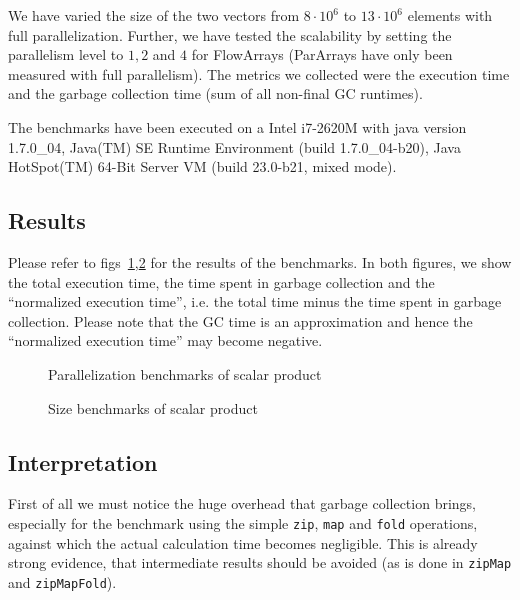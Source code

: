 \documentclass[runningheads,a4paper,fleqn]{llncs}
\begin{document}
We have varied the size of the two vectors from $8 \cdot 10^6$ to $13
\cdot 10^6$ elements with full parallelization. Further, we have
tested the scalability by setting the parallelism level to $1,2$ and
$4$ for FlowArrays (ParArrays have only been measured with full
parallelism). The metrics we collected were the execution time and the
garbage collection time (sum of all non-final GC runtimes).

The benchmarks have been executed on a Intel i7-2620M with java
version 1.7.0\_04, Java(TM) SE Runtime Environment (build
1.7.0\_04-b20), Java HotSpot(TM) 64-Bit Server VM (build 23.0-b21,
mixed mode).

\subsection{Results}

Please refer to figs~\ref{fig:par-bench},\ref{fig:size-bench} for the
results of the benchmarks. In both figures, we show the total
execution time, the time spent in garbage collection and the
``normalized execution time'', i.e. the total time minus the time
spent in garbage collection. Please note that the GC time is an
approximation and hence the ``normalized execution time'' may become
negative.

\begin{figure}
\caption{Parallelization benchmarks of scalar product}
\label{fig:par-bench}
\end{figure}

\begin{figure}
\caption{Size benchmarks of scalar product}
\label{fig:size-bench}
\end{figure}

\subsection{Interpretation}
First of all we must notice the huge overhead that garbage collection
brings, especially for the benchmark using the simple \texttt{zip},
\texttt{map} and \texttt{fold} operations, against which the actual
calculation time becomes negligible. This 
is already strong evidence, that intermediate results should be
avoided (as is done in \texttt{zipMap} and \texttt{zipMapFold}).
\end{document}
